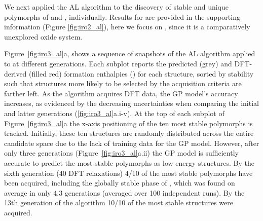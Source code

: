 %



%
We next applied the AL algorithm to the discovery of stable and unique polymorphs of \IrOtwo and \IrOthree, individually.
%
Results for \IrOtwo are provided in the supporting information (Figure \ref{fig:iro2_al}), here we focus on \IrOthree,
since it is a comparatively unexplored oxide system.


%
%
Figure~\ref{fig:iro3_al}a, shows a sequence of snapshots of the AL algorithm applied to \IrOthree at different generations.
%
Each subplot reports the predicted (grey) and DFT-derived (filled red) formation enthalpies (\DHf) for each structure, sorted by stability such that structures more likely to be selected by the acquisition criteria are farther left.
%
As the algorithm acquires DFT data, the GP model's accuracy increases,
as evidenced by the decreasing uncertainties when comparing the initial and latter generations (\ref{fig:iro3_al}a.i-v).
%
At the top of each subplot of Figure~\ref{fig:iro3_al}a the x-axis positioning of the ten most stable polymorphs is tracked.
%
Initially, these ten structures are randomly distributed across the entire candidate space due to the lack of training data for the GP model.
%
However, after only three generations (Figure~\ref{fig:iro3_al}a.ii) the GP model is sufficiently accurate to predict the most stable polymorphs as low energy structures.
%
By the sixth generation (\num{40} DFT relaxations) \num{4/10} of the most stable polymorphs have been acquired,
including the globally stable phase of \IrOthree, which
was found on average in only 4.3 generations (averaged over 100 independent runs).
%
By the 13th generation of the algorithm \num{10/10} of the most stable structures were acquired.


